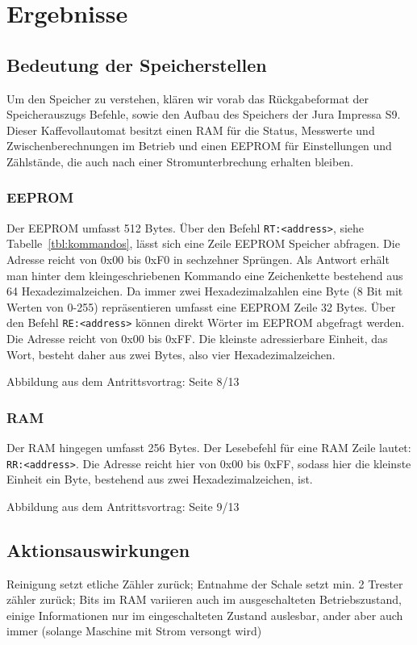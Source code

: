 \chapter{Ergebnisse}

\section{Bedeutung der Speicherstellen}




Um den Speicher zu verstehen, klären wir vorab das Rückgabeformat der Speicherauszugs Befehle, sowie den Aufbau des Speichers der Jura Impressa S9.
Dieser Kaffevollautomat besitzt einen \ac{RAM} für die Status, Messwerte und Zwischenberechnungen im Betrieb und einen \ac{EEPROM} für Einstellungen und Zählstände, die auch nach einer Stromunterbrechung erhalten bleiben.

\subsection{EEPROM}
Der \acf{EEPROM} umfasst 512 Bytes.
Über den Befehl \texttt{RT:<address>}, siehe Tabelle~\ref{tbl:kommandos}, lässt sich eine Zeile \ac{EEPROM} Speicher abfragen.
Die Adresse reicht von 0x00 bis 0xF0 in sechzehner Sprüngen.
Als Antwort erhält man hinter dem kleingeschriebenen Kommando eine Zeichenkette bestehend aus 64 Hexadezimalzeichen.
Da immer zwei Hexadezimalzahlen eine Byte (8 Bit mit Werten von 0-255) repräsentieren umfasst eine \ac{EEPROM} Zeile 32 Bytes.
Über den Befehl \texttt{RE:<address>} können direkt Wörter im \ac{EEPROM} abgefragt werden. Die Adresse reicht von 0x00 bis 0xFF. Die kleinste adressierbare Einheit, das Wort, besteht daher aus zwei Bytes, also vier Hexadezimalzeichen.

\todo Abbildung aus dem Antrittsvortrag: Seite 8/13

\subsection{RAM}
Der \acf{RAM} hingegen umfasst 256 Bytes.
Der Lesebefehl für eine \ac{RAM} Zeile lautet: \texttt{RR:<address>}. Die Adresse reicht hier von 0x00 bis 0xFF, sodass hier die kleinste Einheit ein Byte, bestehend aus zwei Hexadezimalzeichen, ist.

\todo Abbildung aus dem Antrittsvortrag: Seite 9/13


\section{Aktionsauswirkungen}
Reinigung setzt etliche Zähler zurück; Entnahme der Schale setzt min. 2 Trester zähler zurück; Bits im RAM variieren auch im ausgeschalteten Betriebszustand, einige Informationen nur im eingeschalteten Zustand auslesbar, ander aber auch immer (solange Maschine mit Strom versongt wird)
